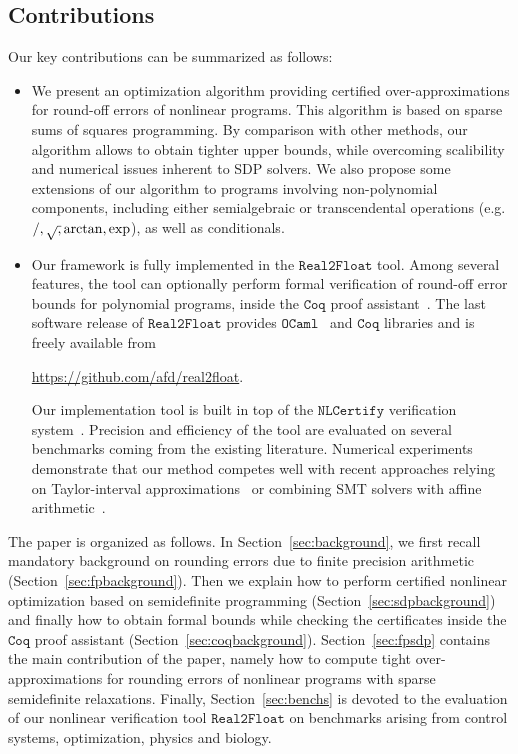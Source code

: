 \documentclass[a4paper,10pt]{article}
\newcommand{\realtofloat}{\mathtt{Real2Float}}
\newcommand{\ocaml}{\mathtt{OCaml}}
\newcommand{\coq}{\mathtt{Coq}}
\newcommand{\nlcertify}{\mathtt{NLCertify}}
\theoremstyle{plain}
\theoremstyle{definition}
\theoremstyle{remark}
\begin{document}
\subsection{Contributions}
Our key contributions can be summarized as follows:
\begin{itemize}
\item We present an optimization algorithm providing certified over-approximations for round-off errors of nonlinear programs. This algorithm is based on sparse sums of squares programming. By comparison with other methods, our algorithm allows to obtain tighter upper bounds, while overcoming scalibility and numerical issues inherent to SDP solvers. We also propose some extensions of our algorithm to programs involving non-polynomial components, including either semialgebraic or transcendental operations (e.g. $/, \sqrtsign, \arctan, \exp$), as well as conditionals.
\item Our framework is fully implemented in the $\realtofloat$ tool.  Among several features, the tool can optionally perform formal verification of round-off error bounds for polynomial programs, inside the $\coq$ proof assistant~\cite{CoqProofAssistant}. The last software release of $\realtofloat$ provides $\ocaml$~\cite{OCaml} and $\coq$ libraries and is freely available from 
\begin{center}
\url{https://github.com/afd/real2float}.
\end{center}
%
Our implementation tool is built in top of the $\nlcertify$ verification system~\cite{icms14}. Precision and efficiency of the tool are evaluated on several benchmarks coming from the existing literature. Numerical experiments demonstrate that our method competes well with recent approaches relying on Taylor-interval approximations~\cite{Darulova14Popl} or combining SMT solvers with affine arithmetic~\cite{Darulova14Popl}.
\end{itemize}
%


The paper is organized as follows.
%
In Section~\ref{sec:background}, we first recall mandatory background on rounding errors due to finite precision arithmetic (Section~\ref{sec:fpbackground}). Then we explain how to perform certified nonlinear optimization based on semidefinite programming (Section~\ref{sec:sdpbackground}) and finally how to obtain formal bounds while checking the certificates inside the $\coq$ proof assistant (Section~\ref{sec:coqbackground}).
%
Section~\ref{sec:fpsdp} contains the main contribution of the paper, namely how to compute tight over-approximations for rounding errors of nonlinear programs with sparse semidefinite relaxations.
%
Finally, Section~\ref{sec:benchs} is devoted to the evaluation of our nonlinear verification tool $\realtofloat$ on benchmarks arising from control systems, optimization, physics and biology.
\end{document}
